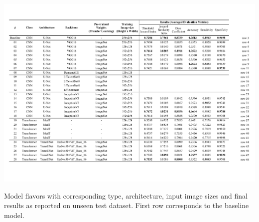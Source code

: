 \begin{table}[ht]
  \centering
  \includegraphics[width=\textwidth]{assets/results.pdf}
  \caption[Results]{Model flavors with corresponding type, architecture, input image sizes and final results as reported on unseen test dataset. First row corresponds to the baseline model.}
  \label{table:results}
\end{table}

